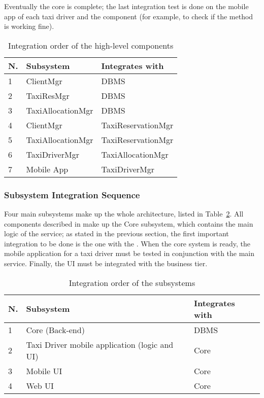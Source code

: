 \documentclass[a4paper, 12pt]{article}
\begin{document}
Eventually the core is complete; the last integration test is done on the mobile app of each taxi driver and the  component (for example, to check if the  method is working fine).

\begin{table}
    \centering
    \begin{tabular}{| l | l | l |}
        \hline
        \textbf{N.} & \textbf{Subsystem} & \textbf{Integrates with} \\
        \hline
        1 & ClientMgr & DBMS \\
        2 & TaxiResMgr & DBMS \\
        3 & TaxiAllocationMgr & DBMS \\
        4 & ClientMgr & TaxiReservationMgr \\
        5 & TaxiAllocationMgr & TaxiReservationMgr \\
        6 & TaxiDriverMgr & TaxiAllocationMgr \\
        7 & Mobile App & TaxiDriverMgr \\
        \hline
    \end{tabular}
    \caption{Integration order of the high-level components}
    \label{tab:component-integration}
\end{table}

\subsubsection{Subsystem Integration Sequence}
\label{ssub:subsystem_integration_sequence}

Four main subsystems make up the whole architecture, listed in Table~\ref{tab:subsystem-integration}. All components described in \cite{bib:dd} make up the Core subsystem, which contains the main logic of the service; as stated in the previous section, the first important integration to be done is the one with the . When the core system is ready, the mobile application for a taxi driver must be tested in conjunction with the main service. Finally, the UI must be integrated with the business tier.

\begin{table}
    \centering
    \begin{tabular}[h!bp]{| l | l | l |}
        \hline
        \textbf{N.} & \textbf{Subsystem} & \textbf{Integrates with} \\
        \hline
        1 & Core (Back-end) & DBMS \\
        2 & Taxi Driver mobile application (logic and UI) & Core \\
        3 & Mobile UI & Core \\
        4 & Web UI & Core \\
        \hline
    \end{tabular}
    \caption{Integration order of the subsystems}
    \label{tab:subsystem-integration}
\end{table}
\end{document}
